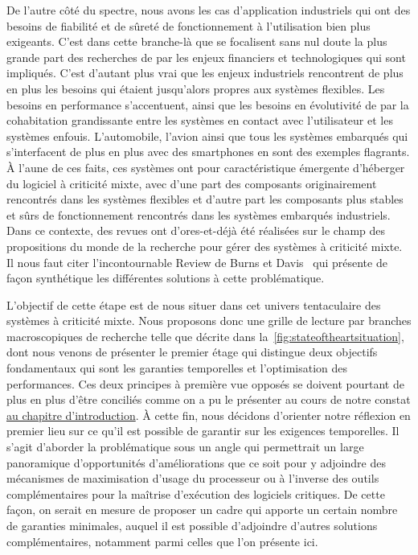 \documentclass[french, a4paper, 11pt, twoside, pdftex]{StyleThese}
\begin{document}
    De l'autre côté du spectre, nous avons les cas d'application industriels qui ont des besoins de fiabilité et de sûreté de fonctionnement à l'utilisation bien plus exigeants. C'est dans cette branche-là que se focalisent sans nul doute la plus grande part des recherches de par les enjeux financiers et technologiques qui sont impliqués. C'est d'autant plus vrai que les enjeux industriels rencontrent de plus en plus les besoins qui étaient jusqu'alors propres aux systèmes flexibles. Les besoins en performance s'accentuent, ainsi que les besoins en évolutivité de par la cohabitation grandissante entre les systèmes en contact avec l'utilisateur et les systèmes enfouis. L'automobile, l'avion ainsi que tous les systèmes embarqués qui s'interfacent de plus en plus avec des smartphones en sont des exemples flagrants. À l'aune de ces faits, ces systèmes ont pour caractéristique émergente d'héberger du logiciel à criticité mixte, avec d'une part des composants originairement rencontrés dans les systèmes flexibles et d'autre part les composants plus stables et sûrs de fonctionnement rencontrés dans les systèmes embarqués industriels. Dans ce contexte, des revues ont d'ores-et-déjà été réalisées sur le champ des propositions du monde de la recherche pour gérer des systèmes à criticité mixte. Il nous faut citer l'incontournable Review de Burns et Davis~\cite{burns_mixed_2022} qui présente de façon synthétique les différentes solutions à cette problématique. 
    
    L'objectif de cette étape est de nous situer dans cet univers tentaculaire des systèmes à criticité mixte. Nous proposons donc une grille de lecture par branches macroscopiques de recherche telle que décrite dans la~\autoref{fig:stateoftheartsituation}, dont nous venons de présenter le premier étage qui distingue deux objectifs fondamentaux qui sont les garanties temporelles et l'optimisation des performances. Ces deux principes à première vue opposés se doivent pourtant de plus en plus d'être conciliés comme on a pu le présenter au cours de notre constat \hyperref[chap:1_EnjeuxIntro]{au chapitre d'introduction}. 
    À cette fin, nous décidons d'orienter notre réflexion en premier lieu sur ce qu'il est possible de garantir sur les exigences temporelles. Il s'agit d'aborder la problématique sous un angle qui permettrait un large panoramique d'opportunités d'améliorations que ce soit pour y adjoindre des mécanismes de maximisation d'usage du processeur ou à l'inverse des outils complémentaires pour la maîtrise d'exécution des logiciels critiques. De cette façon, on serait en mesure de proposer un cadre qui apporte un certain nombre de garanties minimales, auquel il est possible d'adjoindre d'autres solutions complémentaires, notamment parmi celles que l'on présente ici. 
    
\end{document}
